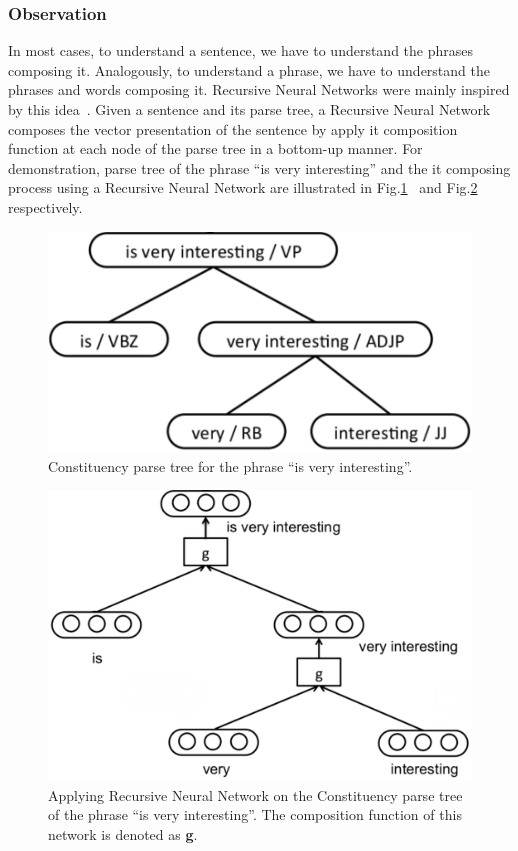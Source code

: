\subsubsection{Observation}
In most cases, to understand a sentence, we have to understand the phrases composing it.
Analogously, to understand a phrase, we have to understand the phrases and words composing it.
Recursive Neural Networks were mainly inspired by this idea~\cite{treeLSTM}.
Given a sentence and its parse tree, a Recursive Neural Network composes the vector presentation of the sentence by apply it composition function at each node of the parse tree in a bottom-up manner.
For demonstration, parse tree of the phrase ``is very interesting'' and the it composing process using a Recursive Neural Network are illustrated in Fig.\ref{fig:example-parse}~\cite{tag-embedding-rnn} and Fig.\ref{fig:example-compose} respectively.


\begin{figure}[H]
    \centering
    \includegraphics[scale=0.5]{figure/example-parse}
    \caption[Constituency parse tree for the phrase ``is very interesting'']{Constituency parse tree for the phrase ``is very interesting''.}
    \label{fig:example-parse}
\end{figure}

\begin{figure}[H]
    \centering
    \includegraphics[scale=0.46]{figure/example-compose}
    \caption[Applying Recursive Neural Network on the phrase ``is very interesting'']{Applying Recursive Neural Network on the Constituency parse tree of the phrase ``is very interesting''.
    The composition function of this network is denoted as \textbf{g}.}
    \label{fig:example-compose}
\end{figure}

